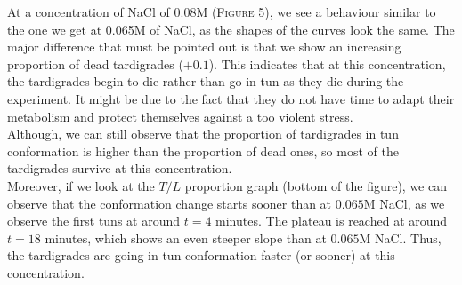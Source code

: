 \documentclass[12pt,a4paper, twocolumn]{article}
\begin{document}
At a concentration of NaCl of $0.08$M (\textsc{Figure} 5), we see a behaviour similar to the one we get at 0.065M of NaCl, as the shapes of the curves look the same. The major difference that must be pointed out is that we show an increasing proportion of dead tardigrades ($+0.1$). This indicates that at this concentration, the tardigrades begin to die rather than go in tun as they die during the experiment. It might be due to the fact that they do not have time to adapt their metabolism and protect themselves against a too violent stress. \\
Although, we can still observe that the proportion of tardigrades in tun conformation is higher than the proportion of dead ones, so most of the tardigrades survive at this concentration.\\
Moreover, if we look at the $T/L$ proportion graph (bottom of the figure), we can observe that the conformation change starts sooner than at $0.065$M NaCl, as we observe the first tuns at around $t=4$ minutes. The plateau is reached at around $t=18$ minutes, which shows an even steeper slope than at $0.065$M NaCl. Thus, the tardigrades are going in tun conformation faster (or sooner) at this concentration.
\end{document}
